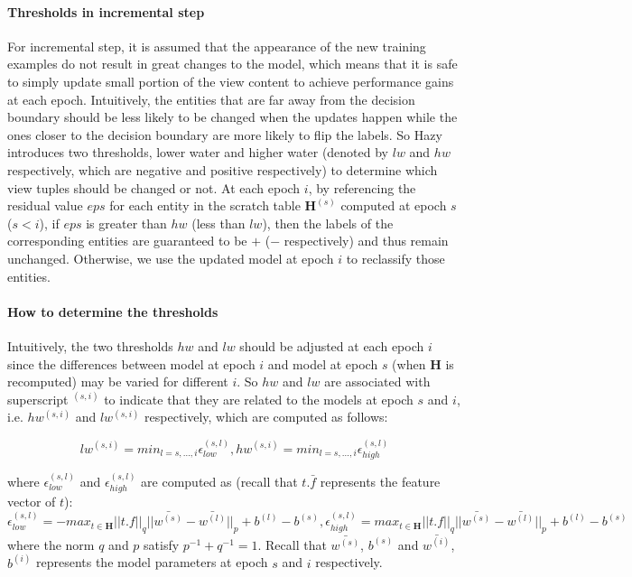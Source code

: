 \paragraph{Thresholds in incremental step}
For incremental step, it is assumed that the appearance of the new training examples do not result in great changes to the model, which means that it is safe to simply update small portion of the view content to achieve performance gains at each epoch. Intuitively, the entities that are far away from the decision boundary should be less likely to be changed when the updates happen while the ones closer to the decision boundary are more likely to flip the labels. So Hazy introduces two thresholds, lower water and higher water (denoted by $lw$ and $hw$ respectively, which are negative and positive respectively) to determine which view tuples should be changed or not. At each epoch $i$, by referencing the residual value $eps$ for each entity in the scratch table $\textbf{H}^{(s)}$ computed at epoch $s$ ($s<i$), if $eps$ is greater than $hw$ (less than $lw$), then the labels of the corresponding entities are guaranteed to be $+$ ($-$ respectively) and thus remain unchanged. Otherwise, we use the updated model at epoch $i$ to reclassify those entities. 

\paragraph{How to determine the thresholds}
Intuitively, the two thresholds $hw$ and $lw$ should be adjusted at each epoch $i$ since the differences between model at epoch $i$ and model at epoch $s$ (when $\textbf{H}$ is recomputed) may be varied for different $i$. So $hw$ and $lw$ are associated with superscript $^{(s,i)}$ to indicate that they are related to the models at epoch $s$ and $i$, i.e. $hw^{(s,i)}$ and $lw^{(s,i)}$ respectively, which are computed as follows:

\begin{equation}
    lw^{(s,i)} = min_{l=s,\dots, i}\epsilon_{low}^{(s,l)},
    hw^{(s,i)} = min_{l=s,\dots, i}\epsilon_{high}^{(s,l)}
\end{equation}

where $\epsilon_{low}^{(s,l)}$ and $\epsilon_{high}^{(s,l)}$ are computed as (recall that $t.\bar{f}$ represents the feature vector of $t$):
\begin{equation}\label{eq: epsilon}
    \epsilon_{low}^{(s,l)} = -max_{t \in \textbf{H}}||t.f||_q||\bar{w^{(s)}}-\bar{w^{(l)}}||_p+b^{(l)}-b^{(s)}, \epsilon_{high}^{(s,l)} = max_{t \in \textbf{H}}||t.f||_q||\bar{w^{(s)}}-\bar{w^{(l)}}||_p+b^{(l)}-b^{(s)}
\end{equation}
where the norm $q$ and $p$ satisfy $p^{-1} + q^{-1} = 1$. Recall that $\bar{w^{(s)}}$, $b^{(s)}$ and $\bar{w^{(i)}}$, $b^{(i)}$ represents the model parameters at epoch $s$ and $i$ respectively.


